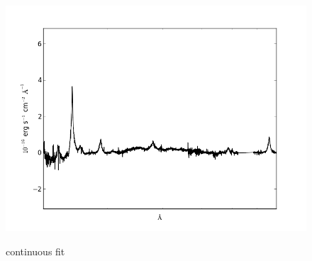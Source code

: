 \documentclass[usenatbib]{mn2e}
\begin{document}
\begin{figure}
\begin{center}
\vspace{5mm}
\includegraphics[width=0.49\linewidth,angle=0]{no_continuous_2.png}\\

\end{center} 
\caption{continuous fit \label{fig:landscape}}   
\end{figure}

\newpage
\end{document}
